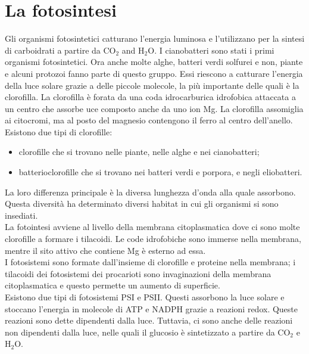 \section{La fotosintesi}
Gli organismi fotosintetici catturano l'energia luminosa e l'utilizzano per la sintesi di carboidrati a partire da CO$_2$ and H$_2$O. I cianobatteri sono stati i primi organismi fotosintetici. Ora anche molte alghe, batteri verdi solfurei e non, piante e alcuni protozoi fanno parte di questo gruppo. Essi riescono a catturare l'energia della luce solare grazie a delle piccole molecole, la pi\`u importante delle quali \`e la clorofilla. La clorofilla \`e forata da una coda idrocarburica idrofobica attaccata a un centro che assorbe uce composto anche da uno ion Mg. La clorofilla assomiglia ai citocromi, ma al posto del magnesio contengono il ferro al centro dell'anello. 
\\Esistono due tipi di clorofille: 
\begin{itemize}
    \item clorofille che si trovano nelle piante, nelle alghe e nei cianobatteri; 
    \item batterioclorofille che si trovano nei batteri verdi e porpora, e negli eliobatteri.
\end{itemize}
La loro differenza principale \`e la diversa lunghezza d'onda alla quale assorbono. Questa diversit\`a ha determinato diversi habitat in cui gli organismi si sono insediati. 
\\La fotointesi avviene al livello della membrana citoplasmatica dove ci sono molte clorofille a formare i tilacoidi. Le code idrofobiche sono immerse nella membrana, mentre il sito attivo che contiene Mg \`e esterno ad essa. 
\\I fotosistemi sono formate dall'insieme di clorofille e proteine nella membrana; i tilacoidi dei fotosistemi dei procarioti sono invaginazioni della membrana citoplasmatica e questo permette un aumento di superficie.
\\Esistono due tipi di fotosistemi PSI e PSII. Questi assorbono la luce solare e stoccano l'energia in molecole di ATP e NADPH grazie a reazioni redox. Queste reazioni sono dette dipendenti dalla luce. Tuttavia, ci sono anche delle reazioni non dipendenti dalla luce, nelle quali il glucosio \`e sintetizzato a partire da CO$_2$ e H$_2$O.
